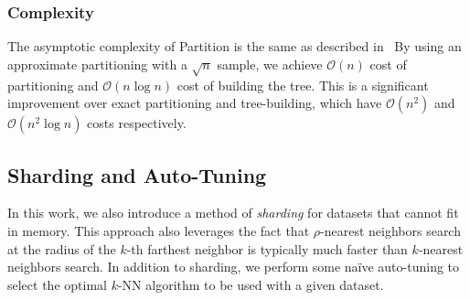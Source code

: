 

\subsubsection {Complexity}
\label{subsubsec:methods:clustering:clustering:complexity}

The asymptotic complexity of Partition is the same as described in~\cite{ishaq2019clustered}
By using an approximate partitioning with a $\sqrt{n}$ sample, we achieve $\mathcal{O}(n)$ cost of partitioning and $\mathcal{O}(n \log n)$ cost of building the tree.
This is a significant improvement over exact partitioning and tree-building, which have $\mathcal{O}(n^2)$ and $\mathcal{O}(n^2 \log n)$ costs respectively.


\subsection {Sharding and Auto-Tuning}
\label{subsec:methods:sharding-and-auto-tuning}

In this work, we also introduce a method of \emph{sharding} for datasets that cannot fit in memory.
This approach also leverages the fact that $\rho$-nearest neighbors search at the radius of the $k$-th farthest neighbor is typically much faster than $k$-nearest neighbors search.
In addition to sharding, we perform some na\"{i}ve auto-tuning to select the optimal $k$-NN algorithm to be used with a given dataset.

